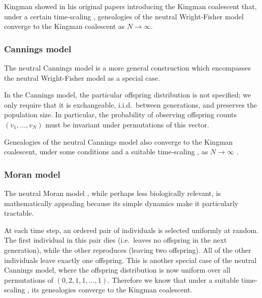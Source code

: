 Kingman showed in his original papers introducing the Kingman coalescent \parencite{kingman1982gene} that, under a certain time-scaling , genealogies of the neutral Wright-Fisher model converge to the Kingman coalescent as $N\to\infty$.

\subsubsection{Cannings model}
The neutral Cannings model \parencite{cannings1974, cannings1975} is a more general construction which encompasses the neutral Wright-Fisher model as a special case.

In the Cannings model, the particular offspring distribution is not specified; we only require that it is exchangeable, i.i.d.\ between generations, and preserves the population size. In particular, the probability of observing offspring counts $(v_1, \dots, v_N)$ must be invariant under permutations of this vector.

Genealogies of the neutral Cannings model also converge to the Kingman coalescent, under some conditions and a suitable time-scaling , as $N\to\infty$ \parencite[see for example][Section 2.2]{etheridge2011}. 

\subsubsection{Moran model}
The neutral Moran model \parencite{moran1958}, while perhaps less biologically relevant, is mathematically appealing because its simple dynamics make it particularly tractable.

At each time step, an ordered pair of individuals is selected uniformly at random. The first individual in this pair dies (i.e.\ leaves no offspring in the next generation), while the other reproduces (leaving two offspring). All of the other individuals leave exactly one offspring.
This is another special case of the neutral Cannings model, where the offspring distribution is now uniform over all permutations of $(0,2,1,1,\dots,1)$.
Therefore we know that under a suitable time-scaling , its genealogies converge to the Kingman coalescent. 

